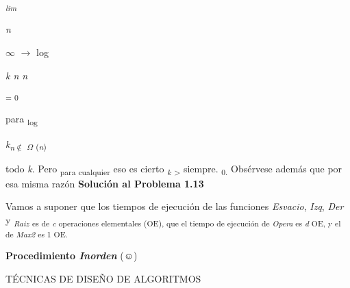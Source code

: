 \documentclass[12pt]{article}
\renewcommand{\_}{\kern-1.5pt\textunderscore\kern-1.5pt}
\begin{document}
\textit{\textsubscript{lim }}{\fontsize{7pt}{8.4pt}\selectfont \textit{n }\par}\par

{\fontsize{6pt}{7.2pt}\selectfont $\infty$ $ \rightarrow $  log \par}\par

\begin{Center}
{\fontsize{7pt}{8.4pt}\selectfont \textit{k n n }\par}
\end{Center}\par

\textsuperscript{= 0 }\par

{\fontsize{10pt}{12.0pt}\selectfont para \textsubscript{log}{\fontsize{7pt}{8.4pt}\selectfont \textit{k\textsubscript{n}}\textsubscript{$ \notin $ $ \Omega $ (\textit{n}) }{\fontsize{10pt}{12.0pt}\selectfont todo \textit{k}. Pero \textsubscript{para cualquier }eso es cierto \textit{\textsubscript{k }}\textsubscript{> }siempre. \textsubscript{0. }Obsérvese además que por esa misma razón \textbf{Solución al Problema 1.13 }\par}\par}\par}\par

{\fontsize{10pt}{12.0pt}\selectfont Vamos a suponer que los tiempos de ejecución de las funciones \textit{Esvacio}, \textit{Izq}, \textit{Der }y \textit{\textsubscript{Raiz }}\textsubscript{es de \textit{c }operaciones elementales (OE), que el tiempo de ejecución de \textit{Opera }es \textit{d }OE, y el de \textit{Max2 }es 1 OE. }\par}\par

{\fontsize{10pt}{12.0pt}\selectfont \textbf{Procedimiento \textit{Inorden }}(☺) \par}\par

\begin{adjustwidth}{0.58in}{0.57in}
{\fontsize{10pt}{12.0pt} {\fontsize{7pt}{8.4pt}\selectfont TÉCNICAS DE DISEÑO DE ALGORITMOS \par}\par}\par

\end{adjustwidth}
\end{document}
